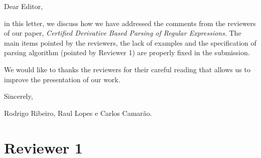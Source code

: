 \documentclass{article}
\date{Ouro Preto, \today}
\begin{document}
\noindent
Dear Editor,

\vspace{1cm}

in this letter, we discuss how we have addressed the comments from the reviewers
of our paper, \textit{Certified Derivative Based Parsing of Regular Expressions}. 
The main items pointed by the reviewers, the lack of examples and the specification 
of parsing algorithm (pointed by Reviewer 1) are properly fixed in the submission.

We would like to thanks the reviewers for their careful reading that allows us 
to improve the presentation of our work.

\vspace{1cm}

\noindent
Sincerely,


\vspace{1cm}

\noindent
Rodrigo Ribeiro, Raul Lopes e Carlos Camar\~ao.

\vspace{1cm}



\section*{Reviewer 1}
\end{document}
